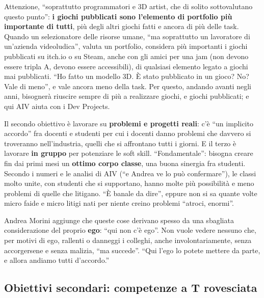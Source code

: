 Attenzione, ``soprattutto programmatori e 3D artist, che di solito
sottovalutano questo punto'': \textbf{i giochi pubblicati sono l'elemento di
portfolio più importante di tutti}, più degli altri giochi fatti e ancora di
più delle task. Quando un selezionatore delle risorse umane, ``ma soprattutto
un lavoratore di un'azienda videoludica'', valuta un portfolio, considera più
importanti i giochi pubblicati su itch.io o su Steam, anche con gli amici
per una jam (non devono essere tripla A, devono essere accessibili), di
qualsiasi elemento legato a giochi mai pubblicati. ``Ho fatto un modello 3D.
È stato pubblicato in un gioco? No? Vale di meno'', e vale ancora meno della
task. Per questo, andando avanti negli anni, bisognerà riuscire sempre di più
a realizzare giochi, e giochi pubblicati; e qui AIV aiuta con i Dev Projects.

Il secondo obiettivo è lavorare su \textbf{problemi e progetti reali}: c'è
``un implicito accordo'' fra docenti e studenti per cui i docenti danno
problemi che davvero si troveranno nell'industria, quelli che si affrontano
tutti i giorni. E il terzo è lavorare \textbf{in gruppo} per potenziare le
soft skill. ``Fondamentale'': bisogna creare fin dai primi mesi un
\textbf{ottimo corpo classe}, una buona sinergia fra studenti. Secondo i
numeri e le analisi di AIV (``e Andrea ve lo può confermare''), le classi
molto unite, con studenti che si supportano, hanno molte più possibilità e
meno problemi di quelle che litigano. ``È banale da dire'', eppure non si sa
quante volte micro faide e micro litigi nati per niente creino problemi
``atroci, enormi''.

Andrea Morini aggiunge che queste cose derivano spesso da una sbagliata
considerazione del proprio \textbf{ego}: ``qui non c'è ego''. Non vuole
vedere nessuno che, per motivi di ego, rallenti o danneggi i colleghi,
anche involontariamente, senza accorgersene e senza malizia, ``ma succede''.
``Qui l'ego lo potete mettere da parte, e allora andiamo tutti d'accordo.''

\subsection{Obiettivi secondari: competenze a T rovesciata}

